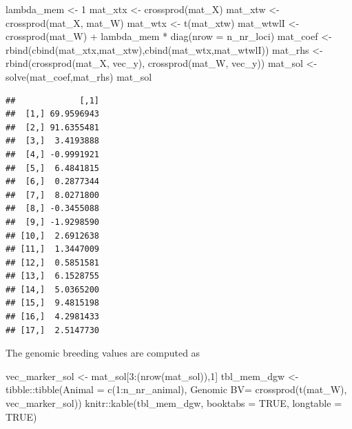 \documentclass[
]{article}
\newenvironment{Shaded}{\begin{snugshade}}{\end{snugshade}}
\newcommand{\AttributeTok}[1]{\textcolor[rgb]{0.77,0.63,0.00}{#1}}
\newcommand{\ConstantTok}[1]{\textcolor[rgb]{0.00,0.00,0.00}{#1}}
\newcommand{\DecValTok}[1]{\textcolor[rgb]{0.00,0.00,0.81}{#1}}
\newcommand{\FunctionTok}[1]{\textcolor[rgb]{0.00,0.00,0.00}{#1}}
\newcommand{\NormalTok}[1]{#1}
\newcommand{\OtherTok}[1]{\textcolor[rgb]{0.56,0.35,0.01}{#1}}
\newcommand{\SpecialCharTok}[1]{\textcolor[rgb]{0.00,0.00,0.00}{#1}}
\newcommand{\StringTok}[1]{\textcolor[rgb]{0.31,0.60,0.02}{#1}}
\begin{document}
\begin{Shaded}
\begin{Highlighting}[]
\NormalTok{lambda\_mem }\OtherTok{\textless{}{-}} \DecValTok{1}
\NormalTok{mat\_xtx }\OtherTok{\textless{}{-}} \FunctionTok{crossprod}\NormalTok{(mat\_X)}
\NormalTok{mat\_xtw }\OtherTok{\textless{}{-}} \FunctionTok{crossprod}\NormalTok{(mat\_X, mat\_W)}
\NormalTok{mat\_wtx }\OtherTok{\textless{}{-}} \FunctionTok{t}\NormalTok{(mat\_xtw)}
\NormalTok{mat\_wtwlI }\OtherTok{\textless{}{-}} \FunctionTok{crossprod}\NormalTok{(mat\_W) }\SpecialCharTok{+}\NormalTok{ lambda\_mem }\SpecialCharTok{*} \FunctionTok{diag}\NormalTok{(}\AttributeTok{nrow =}\NormalTok{ n\_nr\_loci)}
\NormalTok{mat\_coef }\OtherTok{\textless{}{-}} \FunctionTok{rbind}\NormalTok{(}\FunctionTok{cbind}\NormalTok{(mat\_xtx,mat\_xtw),}\FunctionTok{cbind}\NormalTok{(mat\_wtx,mat\_wtwlI))}
\NormalTok{mat\_rhs }\OtherTok{\textless{}{-}} \FunctionTok{rbind}\NormalTok{(}\FunctionTok{crossprod}\NormalTok{(mat\_X, vec\_y),}
                 \FunctionTok{crossprod}\NormalTok{(mat\_W, vec\_y))}
\NormalTok{mat\_sol }\OtherTok{\textless{}{-}} \FunctionTok{solve}\NormalTok{(mat\_coef,mat\_rhs)}
\NormalTok{mat\_sol}
\end{Highlighting}
\end{Shaded}

\begin{verbatim}
##             [,1]
##  [1,] 69.9596943
##  [2,] 91.6355481
##  [3,]  3.4193888
##  [4,] -0.9991921
##  [5,]  6.4841815
##  [6,]  0.2877344
##  [7,]  8.0271800
##  [8,] -0.3455088
##  [9,] -1.9298590
## [10,]  2.6912638
## [11,]  1.3447009
## [12,]  0.5851581
## [13,]  6.1528755
## [14,]  5.0365200
## [15,]  9.4815198
## [16,]  4.2981433
## [17,]  2.5147730
\end{verbatim}

The genomic breeding values are computed as

\begin{Shaded}
\begin{Highlighting}[]
\NormalTok{vec\_marker\_sol }\OtherTok{\textless{}{-}}\NormalTok{ mat\_sol[}\DecValTok{3}\SpecialCharTok{:}\NormalTok{(}\FunctionTok{nrow}\NormalTok{(mat\_sol)),}\DecValTok{1}\NormalTok{]}
\NormalTok{tbl\_mem\_dgw }\OtherTok{\textless{}{-}}\NormalTok{ tibble}\SpecialCharTok{::}\FunctionTok{tibble}\NormalTok{(}\AttributeTok{Animal =} \FunctionTok{c}\NormalTok{(}\DecValTok{1}\SpecialCharTok{:}\NormalTok{n\_nr\_animal),}
                              \StringTok{\textasciigrave{}}\AttributeTok{Genomic BV}\StringTok{\textasciigrave{}}\OtherTok{=} \FunctionTok{crossprod}\NormalTok{(}\FunctionTok{t}\NormalTok{(mat\_W), vec\_marker\_sol))}
\NormalTok{knitr}\SpecialCharTok{::}\FunctionTok{kable}\NormalTok{(tbl\_mem\_dgw, }\AttributeTok{booktabs =} \ConstantTok{TRUE}\NormalTok{, }\AttributeTok{longtable =} \ConstantTok{TRUE}\NormalTok{)}
\end{Highlighting}
\end{Shaded}
\end{document}
